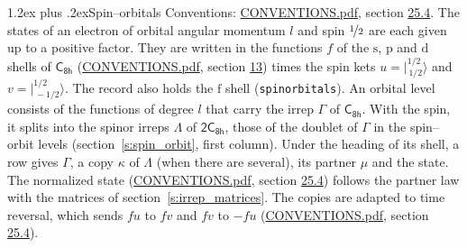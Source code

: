 \documentclass[10pt,a4paper]{article}
\makeatletter
\renewcommand\section{\@startsection{section}{1}{\z@}{-3ex plus -1ex minus -.2ex}%
  {1.2ex plus .2ex}{\normalfont\large\sffamily\bfseries\color{parttitle}}}
\numberwithin{equation}{section}
\newcommand{\grp}[1]{\mathsf{#1}}
\newcommand{\orbital}[1]{\mathrm{#1}}
\newcommand{\mult}{\kappa}
\newcommand{\intx}{\mu}
\newcommand{\jm}[2]{\bigl\lvert{}^{#1}_{\,#2}\bigr\rangle}
\makeatother
\begin{document}
\section{Spin--orbitals}\label{s:spin_orbitals}
Conventions: \href{../../CONVENTIONS.pdf}{CONVENTIONS.pdf}, section \href{../../CONVENTIONS.pdf\#conv.25.4}{25.4}.
\leavevmode\label{n:index.orbital.l}The states of an electron of orbital angular momentum $l$ and spin $\nicefrac{1}{2}$ are each given up to a positive factor. \label{n:local.spinor.uv}\label{n:local.function.f}They are written in the functions $f$ of the $\orbital{s}$, $\orbital{p}$ and $\orbital{d}$ shells of \href{../../../rotation/data/pdf/C8h.pdf}{$\grp{C_{8h}}$} (\href{../../CONVENTIONS.pdf}{CONVENTIONS.pdf}, section \href{../../../rotation/CONVENTIONS.pdf\#conv.13}{13}) times the spin kets $u = \jm{1/2}{1/2}$ and $v = \jm{1/2}{-1/2}$. The record also holds the $\orbital{f}$ shell (\texttt{spinorbitals}). An orbital level consists of the functions of degree $l$ that carry the irrep $\Gamma$ of \href{../../../rotation/data/pdf/C8h.pdf}{$\grp{C_{8h}}$}. With the spin, it splits into the spinor irreps $\Lambda$ of $\grp{2C_{8h}}$, those of the doublet of $\Gamma$ in the spin--orbit levels (section~\ref{s:spin_orbit}, first column). \label{n:head.state}Under the heading of its shell, a row gives $\Gamma$, a copy $\mult$ of $\Lambda$ (when there are several), its partner $\intx$ and the state. The normalized state (\href{../../CONVENTIONS.pdf}{CONVENTIONS.pdf}, section \href{../../CONVENTIONS.pdf\#conv.25.4}{25.4}) follows the partner law with the matrices of section~\ref{s:irrep_matrices}. The copies are adapted to time reversal, which sends $f u$ to $f v$ and $f v$ to $-f u$ (\href{../../CONVENTIONS.pdf}{CONVENTIONS.pdf}, section \href{../../CONVENTIONS.pdf\#conv.25.4}{25.4}).
\end{document}

